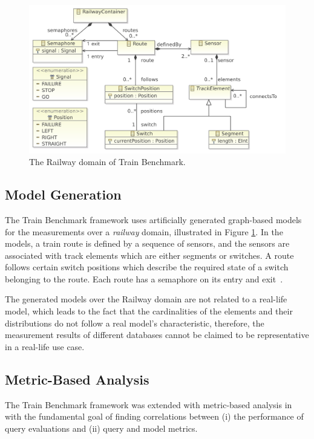 \begin{figure}[!ht]
	\centering
	\includegraphics[width=150mm, keepaspectratio]{figures/railway-containments.pdf}
	\caption{The Railway domain of Train Benchmark.}
	\label{fig:tb_domain}
\end{figure}

\subsection{Model Generation}

The Train Benchmark framework uses artificially generated graph-based models for the measurements over a \textit{railway} domain, illustrated in Figure \ref{fig:tb_domain}. In the models, a train route is defined by a sequence of sensors, and the sensors are associated with track elements which are either segments or switches. A route follows certain switch positions which describe the required state of a switch belonging to the route. Each route has a semaphore on its entry and exit~\cite{train_ttc}.

The generated models over the Railway domain are not related to a real-life model, which leads to the fact that the cardinalities of the elements and their distributions do not follow a real model's characteristic, therefore, the measurement results of different databases cannot be claimed to be representative in a real-life use case.

\subsection{Metric-Based Analysis}

The Train Benchmark framework was extended with metric-based analysis in~\cite{metric_ase} with the fundamental goal of finding correlations between (i) the performance of query evaluations and (ii) query and model metrics.


